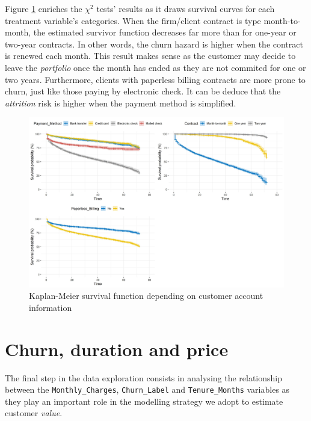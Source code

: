 \documentclass[
]{book}
\begin{document}
Figure \ref{fig:kmcustaccount} enriches the \(\chi^2\) tests' results as it draws survival curves for each treatment variable's categories. When the firm/client contract is type month-to-month, the estimated survivor function decreases far more than for one-year or two-year contracts. In other words, the churn hazard is higher when the contract is renewed each month. This result makes sense as the customer may decide to leave the \emph{portfolio} once the month has ended as they are not commited for one or two years. Furthermore, clients with paperless billing contracts are more prone to churn, just like those paying by electronic check. It can be deduce that the \emph{attrition} risk is higher when the payment method is simplified.

\begin{figure}

{\centering \includegraphics[width=50in]{./imgs/account_info_plot} 

}

\caption{Kaplan-Meier survival function depending on customer account information}\label{fig:kmcustaccount}
\end{figure}

\hypertarget{churn-duration-and-price}{%
\section{Churn, duration and price}\label{churn-duration-and-price}}

The final step in the data exploration consists in analysing the relationship between the \texttt{Monthly\_Charges}, \texttt{Churn\_Label} and \texttt{Tenure\_Months} variables as they play an important role in the modelling strategy we adopt to estimate customer \emph{value}.
\end{document}

